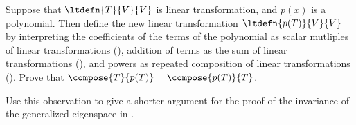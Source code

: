Suppose that $\ltdefn{T}{V}{V}$ is linear transformation, and $p(x)$ is a polynomial.  Then define the new linear transformation $\ltdefn{p(T)}{V}{V}$ by interpreting the coefficients of the terms of the polynomial as scalar mutliples of linear transformations (), addition of terms as the sum of linear transformations (), and powers as repeated composition of linear transformations ().  Prove that $\compose{T}{p(T)}=\compose{p(T)}{T}$.\par
%
Use this observation to give a shorter argument for the proof of the invariance of the generalized eigenspace in .